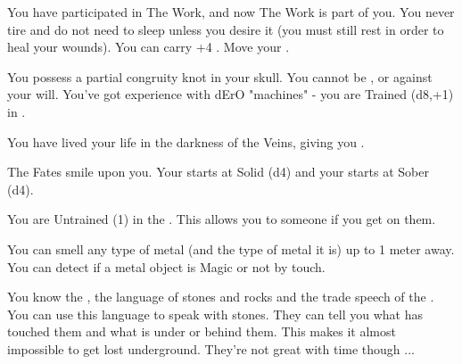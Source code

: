 \begin{multicols*}{2}
{{      \myskip

        You have participated in The Work, and now The Work is part of you.  You never tire and do not need to sleep unless you desire it (you must still rest in order to heal your wounds). You can carry +4 . Move your \TAL \DCUP.

      \myskip

        You possess a partial congruity knot in your skull.  You cannot be ,  or  against your will. You've got experience with dErO "machines" - you are Trained (d8,+1) in .

}}

\cbreak



  You have lived your life in the darkness of the Veins, giving you .



  The Fates smile upon you. Your \INJURY starts at Solid (d4) and your \INSANITY starts at Sober (d4). 



    You are Untrained (1) in the . This allows you to  someone if you get  on them.


  You can smell any type of metal (and the type of metal it is) up to 1 meter away. You can detect if a metal object is Magic or not by touch.


  You know the , the language of stones and rocks and the trade speech of the .  You can use this language to speak with stones. They can tell you what has touched them and what is under or behind them.  This makes it almost impossible to get lost underground. They're not great with time though ...



\end{multicols*}
